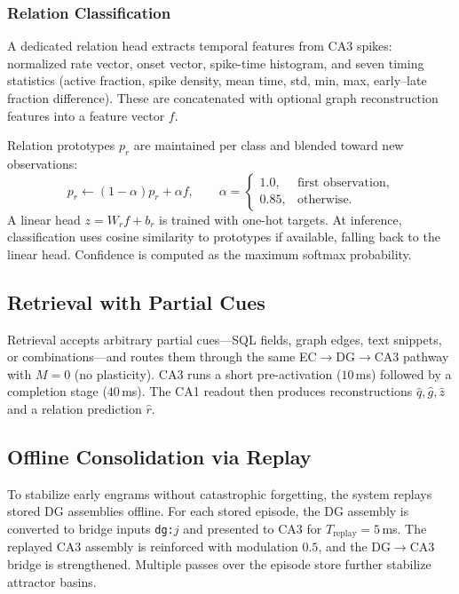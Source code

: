 \subsubsection{Relation Classification}

A dedicated relation head extracts temporal features from CA3 spikes: normalized rate vector, onset vector, spike-time histogram, and seven timing statistics (active fraction, spike density, mean time, std, min, max, early--late fraction difference). These are concatenated with optional graph reconstruction features into a feature vector $f$.

Relation prototypes $p_r$ are maintained per class and blended toward new observations:
\begin{equation}
p_r \leftarrow (1 - \alpha) p_r + \alpha f, \qquad \alpha =
\begin{cases}
1.0, & \text{first observation}, \\
0.85, & \text{otherwise}.
\end{cases}
\end{equation}
A linear head $z = W_r f + b_r$ is trained with one-hot targets. At inference, classification uses cosine similarity to prototypes if available, falling back to the linear head. Confidence is computed as the maximum softmax probability.


\subsection{Retrieval with Partial Cues}
\label{sec:retrieval}

Retrieval accepts arbitrary partial cues---SQL fields, graph edges, text snippets, or combinations---and routes them through the same EC$\rightarrow$DG$\rightarrow$CA3 pathway with $M=0$ (no plasticity). CA3 runs a short pre-activation ($10$\,ms) followed by a completion stage ($40$\,ms). The CA1 readout then produces reconstructions $\hat{q}, \hat{g}, \hat{z}$ and a relation prediction $\hat{r}$.


\subsection{Offline Consolidation via Replay}
\label{sec:consolidation}

To stabilize early engrams without catastrophic forgetting, the system replays stored DG assemblies offline. For each stored episode, the DG assembly is converted to bridge inputs \texttt{dg:$j$} and presented to CA3 for $T_{\mathrm{replay}} = 5$\,ms. The replayed CA3 assembly is reinforced with modulation $0.5$, and the DG$\rightarrow$CA3 bridge is strengthened. Multiple passes over the episode store further stabilize attractor basins.


